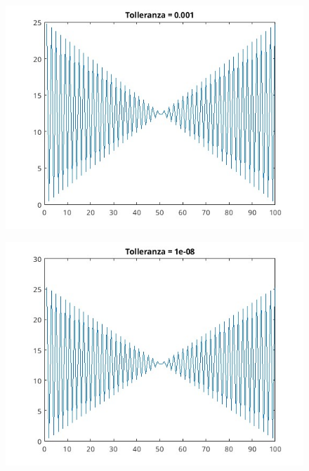 \documentclass[10pt,a4paper]{article}
\begin{document}
\section{}
\begin{figure}
  \centering
  \includegraphics[width=1.2\textwidth]{../figure/15/tol1e-3.jpg}    
\end{figure}
\begin{figure}
  \centering
  \includegraphics[width=1.2\textwidth]{../figure/15/tol1e-8.jpg}    
\end{figure}
\end{document}
